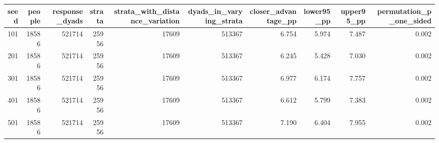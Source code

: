 \begin{tabular}{rrrrrrrrrr}
\toprule
seed & people & response\_dyads & strata & strata\_with\_distance\_variation & dyads\_in\_varying\_strata & closer\_advantage\_pp & lower95\_pp & upper95\_pp & permutation\_p\_one\_sided \\
\midrule
101 & 18586 & 521714 & 25956 & 17609 & 513367 & 6.754 & 5.974 & 7.487 & 0.002 \\
201 & 18586 & 521714 & 25956 & 17609 & 513367 & 6.245 & 5.428 & 7.030 & 0.002 \\
301 & 18586 & 521714 & 25956 & 17609 & 513367 & 6.977 & 6.174 & 7.757 & 0.002 \\
401 & 18586 & 521714 & 25956 & 17609 & 513367 & 6.612 & 5.799 & 7.383 & 0.002 \\
501 & 18586 & 521714 & 25956 & 17609 & 513367 & 7.190 & 6.404 & 7.955 & 0.002 \\
\bottomrule
\end{tabular}
